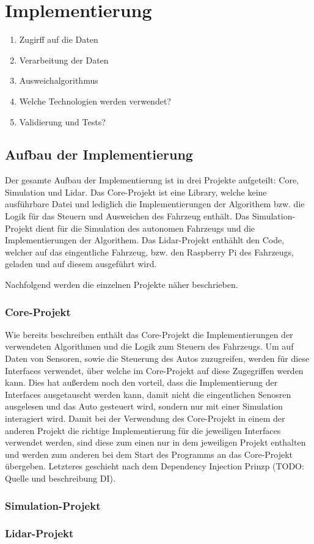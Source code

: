 \section{Implementierung}

\begin{enumerate}
    \item Zugirff auf die Daten
    \item Verarbeitung der Daten
    \item Ausweichalgorithmus
    \item Welche Technologien werden verwendet?
    \item Validierung und Tests?
\end{enumerate}

\subsection{Aufbau der Implementierung}

Der gesamte Aufbau der Implementierung ist in drei Projekte aufgeteilt: Core, Simulation und Lidar. Das Core-Projekt ist eine Library, welche keine ausführbare Datei und lediglich die Implementierungen der Algorithem bzw. die Logik für das Steuern und Ausweichen des Fahrzeug enthält. Das Simulation-Projekt dient für die Simulation des autonomen Fahrzeugs und die Implementierungen der Algorithem. Das Lidar-Projekt enthählt den Code, welcher auf das eingentliche Fahrzeug, bzw. den Raspberry Pi des Fahrzeugs, geladen und auf diesem ausgeführt wird. 

Nachfolgend werden die einzelnen Projekte näher beschrieben. 

\subsubsection{Core-Projekt}

Wie bereits beschreiben enthält das Core-Projekt die Implementierungen der verwendeten Algorithmen und die Logik zum Steuern des Fahrzeugs. Um auf Daten von Sensoren, sowie die Steuerung des Autos zuzugreifen, werden für diese Interfaces verwendet, über welche im Core-Projekt auf diese Zugegriffen werden kann. Dies hat außerdem noch den vorteil, dass die Implementierung der Interfaces ausgetauscht werden kann, damit nicht die eingentlichen Senosren ausgelesen und das Auto gesteuert wird, sondern nur mit einer Simulation interagiert wird. Damit bei der Verwendung des Core-Projekt in einem der anderen Projekt die richtige Implementierung für die jeweiligen Interfaces verwendet werden, sind diese zum einen nur in dem jeweiligen Projekt enthalten und werden zum anderen bei dem Start des Programms an das Core-Projekt übergeben. Letzteres geschieht nach dem Dependency Injection Prinzp (TODO: Quelle und beschreibung DI).

\subsubsection{Simulation-Projekt}

\subsubsection{Lidar-Projekt}

\newpage
